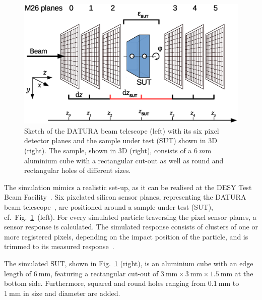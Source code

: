 \documentclass{PoS}
\newcommand{\Datura}{\ensuremath{\textrm{DATURA}}}
\begin{document}
\begin{figure}[!bp]
	\center
	\includegraphics[trim= 50 180 220 20, width=.55\linewidth]{figures/sketch_tscope.eps}
	\hspace{30pt}
	\caption[Sketch of the Datura beam telescope]{%
	Sketch of the $\Datura$ beam telescope (left) with its six pixel detector planes and the sample under test (SUT) shown in 3D (right). %
	The sample, shown in 3D (right), consists of a $\SI{6}{m\meter}$ aluminium cube with a rectangular cut-out as well as round and rectangular holes of different sizes.
	}
	\label{fig:setup}
\end{figure}

The simulation mimics a realistic set-up, as it can be realised at the DESY Test Beam Facility~\cite{ref:DESYtb}. 
Six pixelated  silicon sensor planes, representing the DATURA beam telescope~\cite{JansenEPJ}, are positioned around a sample under test (SUT), cf.\ Fig.~\ref{fig:setup}~(left). 
For every simulated particle traversing the pixel sensor planes, a sensor response is calculated. 
The simulated response consists of clusters of one or more registered pixels,
 depending on the impact position of the particle, and is trimmed to its measured response~\cite{ref:datura-inpixel}.

The simulated SUT, shown in Fig.~\ref{fig:setup} (right), is an aluminium cube with an edge length of $\SI{6}{\mm}$,
 featuring a rectangular cut-out of $\SI{3}{\mm}\times\SI{3}{\mm}\times\SI{1.5}{\mm}$ at the bottom side. 
Furthermore, squared and round holes ranging from $\SI{0.1}{\mm}$ to $\SI{1}{\mm}$ in size and diameter are added.%
\end{document}
